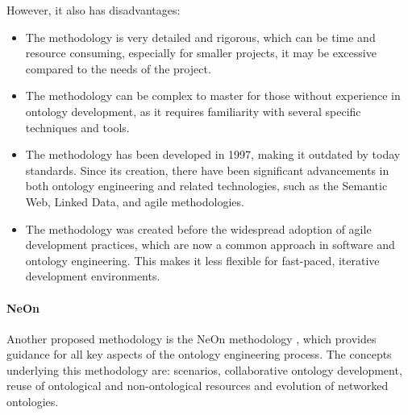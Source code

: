 However, it also has disadvantages:
\begin{itemize}
    \item The methodology is very detailed and rigorous, which can be time and resource consuming, especially for smaller projects, it may be excessive compared to the needs of the project.

    \item The methodology can be complex to master for those without experience in ontology development, as it requires familiarity with several specific techniques and tools.

    \item The methodology has been developed in 1997, making it outdated by today standards. Since its creation, there have been significant advancements in both ontology engineering and related technologies, such as the Semantic Web, Linked Data, and agile methodologies.

    \item The methodology was created before the widespread adoption of agile development practices, which are now a common approach in software and ontology engineering. This makes it less flexible for fast-paced, iterative development environments.
\end{itemize}

\paragraph{NeOn}
Another proposed methodology is the NeOn methodology \cite{neon1,neon2}, which provides guidance for all key aspects of the ontology engineering process.
The concepts underlying this methodology are: scenarios, collaborative ontology development, reuse of ontological and non-ontological resources and evolution of networked ontologies. 

